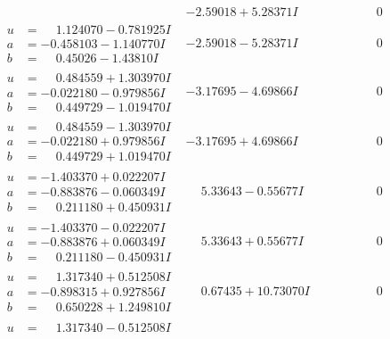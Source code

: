 \documentclass[1p]{elsarticle_modified}
\theoremstyle{definition}
\begin{document}
$$\begin{array}{c|c|c}
 & -2.59018 + 5.28371 I & \phantom{-0.000000 } 0 \\ \hline\begin{aligned}
u &= \phantom{-}1.124070 - 0.781925 I \\
a &= -0.458103 - 1.140770 I \\
b &= \phantom{-}0.45026 - 1.43810 I\end{aligned}
 & -2.59018 - 5.28371 I & \phantom{-0.000000 } 0 \\ \hline\begin{aligned}
u &= \phantom{-}0.484559 + 1.303970 I \\
a &= -0.022180 - 0.979856 I \\
b &= \phantom{-}0.449729 - 1.019470 I\end{aligned}
 & -3.17695 - 4.69866 I & \phantom{-0.000000 } 0 \\ \hline\begin{aligned}
u &= \phantom{-}0.484559 - 1.303970 I \\
a &= -0.022180 + 0.979856 I \\
b &= \phantom{-}0.449729 + 1.019470 I\end{aligned}
 & -3.17695 + 4.69866 I & \phantom{-0.000000 } 0 \\ \hline\begin{aligned}
u &= -1.403370 + 0.022207 I \\
a &= -0.883876 - 0.060349 I \\
b &= \phantom{-}0.211180 + 0.450931 I\end{aligned}
 & \phantom{-}5.33643 - 0.55677 I & \phantom{-0.000000 } 0 \\ \hline\begin{aligned}
u &= -1.403370 - 0.022207 I \\
a &= -0.883876 + 0.060349 I \\
b &= \phantom{-}0.211180 - 0.450931 I\end{aligned}
 & \phantom{-}5.33643 + 0.55677 I & \phantom{-0.000000 } 0 \\ \hline\begin{aligned}
u &= \phantom{-}1.317340 + 0.512508 I \\
a &= -0.898315 + 0.927856 I \\
b &= \phantom{-}0.650228 + 1.249810 I\end{aligned}
 & \phantom{-}0.67435 + 10.73070 I & \phantom{-0.000000 } 0 \\ \hline\begin{aligned}
u &= \phantom{-}1.317340 - 0.512508 I \\

\end{aligned}
\end{array}$$
\end{document}
